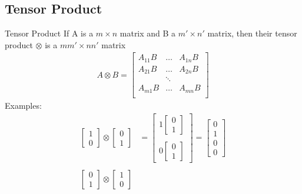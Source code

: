 \documentclass{beamer}
\begin{document}
\subsection{Tensor Product}
\begin{frame}{Tensor Product}
  {\tiny
    If A is a $m \times n$ matrix and B a $m' \times n'$ matrix, then their
    tensor product $\otimes$ is a $mm' \times nn'$ matrix
    \begin{align*}
      A \otimes B = \begin{bmatrix}
                      A_{11}B & \dots & A_{1n}B \\
                      A_{21}B & \dots & A_{2n}B \\
                              & \ddots &        \\
                      A_{m1}B & \dots & A_{mn}B \\
                    \end{bmatrix}
    \end{align*}
    Examples:
    \begin{align*}
      \begin{bmatrix} 1 \\ 0 \end{bmatrix} \otimes \begin{bmatrix} 0 \\ 1 \end{bmatrix} &=
          \begin{bmatrix}
            1 \begin{bmatrix} 0 \\ 1 \end{bmatrix} \\
            \\
            0 \begin{bmatrix} 0 \\ 1 \end{bmatrix}
          \end{bmatrix}
          = \begin{bmatrix} 0 \\ 1 \\ 0 \\ 0 \end{bmatrix} \\
          \\
      \begin{bmatrix} 0 \\ 1 \end{bmatrix} \otimes \begin{bmatrix} 1 \\ 0 \end{bmatrix}

\end{align*}}
\end{frame}
\end{document}
